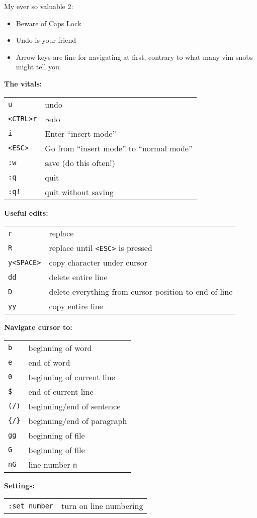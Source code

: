 \documentclass{article}
\begin{document}
My ever so valuable 2\textcent:
\begin{itemize}
    \item Beware of Caps Lock
    \item Undo is your friend
    \item Arrow keys are fine for navigating at first, contrary to what many
        vim snobs might tell you.
\end{itemize}

\textbf{The vitals:}\\
\begin{tabular}{l l}
    \verb|u| & undo\\
    \verb|<CTRL>r| & redo\\
    \verb|i| & Enter ``insert mode''\\
    \verb|<ESC>| & Go from ``insert mode'' to ``normal mode'' \\
    \verb|:w| & save (do this often!)\\
    \verb|:q| & quit\\
    \verb|:q!| & quit without saving\\
\end{tabular}

\textbf{Useful edits:}\\
\begin{tabular}{l l}
    \verb|r| & replace\\
    \verb|R| & replace until \verb|<ESC>| is pressed\\
    \verb|y<SPACE>| & copy character under cursor\\
    \verb|dd| & delete entire line\\
    \verb|D| & delete everything from cursor position to end of line\\
    \verb|yy| & copy entire line\\
\end{tabular}

\textbf{Navigate cursor to:}\\
\begin{tabular}{l l}
    \verb|b| & beginning of word \\
    \verb|e| & end of word \\
    \verb|0| & beginning of current line \\
    \verb|$| & end of current line \\
    \verb|(/)| & beginning/end of sentence\\
    \verb|{/}| & beginning/end of paragraph\\
    \verb|gg| & beginning of file\\
    \verb|G| & beginning of file\\
    \verb|nG| & line number \verb|n|\\
\end{tabular}

\textbf{Settings:}\\
\begin{tabular}{l l}
    \verb|:set number| & turn on line numbering
\end{tabular}
\end{document}
